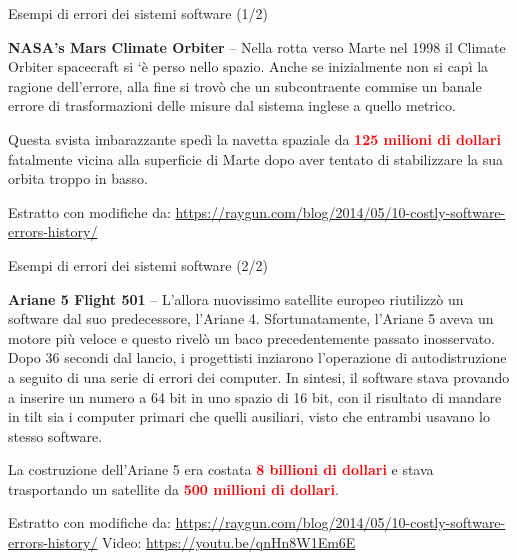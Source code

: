 \documentclass{beamer}
\begin{document}
\begin{frame}{\centerline{Esempi di errori dei sistemi software (1/2)}}


\textbf{NASA’s Mars Climate Orbiter} -- Nella rotta verso Marte nel 1998 il Climate Orbiter spacecraft si `\`{e} perso nello spazio. Anche se inizialmente non si cap\`{i} la ragione dell'errore, alla fine si trov\`{o} che un subcontraente commise un banale errore di trasformazioni delle misure dal sistema inglese a quello metrico.
\vspace{0.5cm}

Questa svista imbarazzante sped\`{i} la navetta spaziale da 
 \textcolor{red}{\bf 125 milioni di dollari} fatalmente vicina alla superficie di Marte dopo aver tentato di stabilizzare la sua orbita troppo in basso.
\newline 
\vspace{1cm}
\begin{center}
    \tiny
    Estratto con modifiche da:
\url{https://raygun.com/blog/2014/05/10-costly-software-errors-history/}
\end{center}
\end{frame}

\begin{frame}{\centerline{Esempi di errori dei sistemi software (2/2)}}
\small
\textbf{Ariane 5 Flight 501} -- L'allora nuovissimo satellite europeo riutilizz\`{o} un software dal suo predecessore, l'Ariane 4. Sfortunatamente, l'Ariane 5 aveva un motore pi\`{u} veloce e questo rivel\`{o} un baco precedentemente passato inosservato. Dopo 36 secondi dal lancio, i progettisti inziarono l'operazione di autodistruzione a seguito di una serie di errori dei computer. In sintesi, il software stava provando a inserire un numero a 64 bit in uno spazio di 16 bit, con il risultato di mandare in tilt sia i computer primari che quelli ausiliari, visto che entrambi usavano lo stesso software.
\vspace{0.5cm}

La costruzione dell'Ariane 5 era costata \textcolor{red}{\bf 8 billioni di dollari}  e stava trasportando un satellite da \textcolor{red}{\bf 500 millioni di dollari}. 
\newline 
\vspace{1cm}
\begin{center}
    \tiny
    Estratto con modifiche da: \url{https://raygun.com/blog/2014/05/10-costly-software-errors-history/} Video:  \url{https://youtu.be/qnHn8W1Em6E}
\end{center}

\end{frame}
\end{document}

